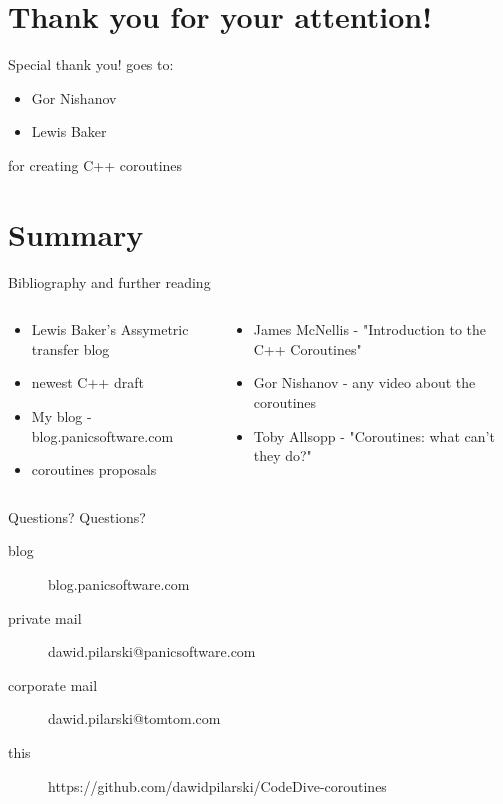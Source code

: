 \documentclass[10pt]{beamer}
\begin{document}
\section*{Thank you for your attention!}

\begin{frame}{Special thank you! goes to:}
	\begin{itemize}
		\item Gor Nishanov
		\item Lewis Baker	
	\end{itemize}

	for creating C++ coroutines 
\end{frame}

\section*{Summary}

\begin{frame}{Bibliography and further reading}
\begin{columns}
\begin{column}{0.48\linewidth}
	\begin{itemize}
		\item Lewis Baker's Assymetric transfer blog
		\item newest C++ draft
		\item My blog - blog.panicsoftware.com
		\item coroutines proposals
	\end{itemize}
\end{column}
\begin{column}{0.48\linewidth}
	\begin{itemize}
		\item James McNellis - "Introduction to the C++ Coroutines"
		\item Gor Nishanov - any video about the coroutines
		\item Toby Allsopp - "Coroutines: what can't they do?"
	\end{itemize}
\end{column}

\end{columns}
\end{frame}

\begin{frame}{Questions?}
\vfill
\centering Questions?
\vfill

\small
\begin{description}
	\item [blog] blog.panicsoftware.com
	\item [private mail] dawid.pilarski@panicsoftware.com
	\item [corporate mail] dawid.pilarski@tomtom.com
	\item [this] https://github.com/dawidpilarski/CodeDive-coroutines
\end{description}
\end{frame}
\end{document}

